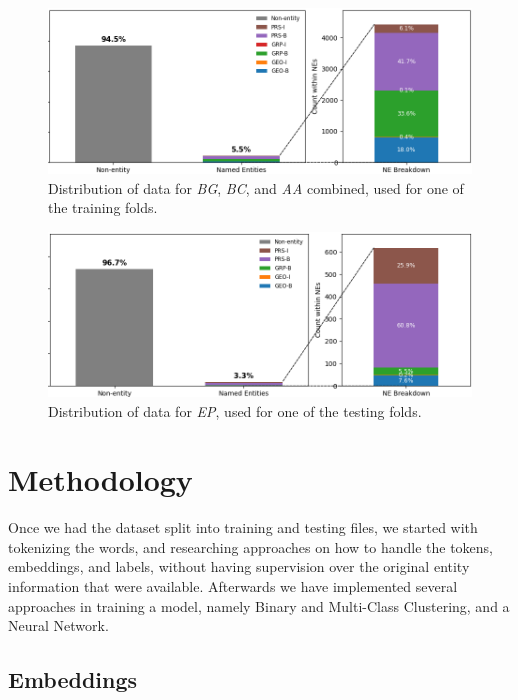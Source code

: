 \documentclass[11pt]{article}
\begin{document}
\begin{figure}[H]
  \includegraphics[width=\columnwidth]{NER-Train.png}
  \caption{Distribution of data for \textit{BG}, \textit{BC}, and \textit{AA} combined, used for one of the training folds.}
  \label{fig:NER-Train}
\end{figure}

\begin{figure}[H]
  \includegraphics[width=\columnwidth]{NER-Test.png}
  \caption{Distribution of data for \textit{EP}, used for one of the testing folds.}
  \label{fig:NER-Test}
\end{figure}

\section{Methodology}

Once we had the dataset split into training and testing files, we started with tokenizing the words, and researching approaches on how to
handle the tokens, embeddings, and labels, without having supervision over the original entity information that were available.
Afterwards we have implemented several approaches in training a model, namely Binary and Multi-Class Clustering, and a Neural Network.

\subsection{Embeddings}
\end{document}
